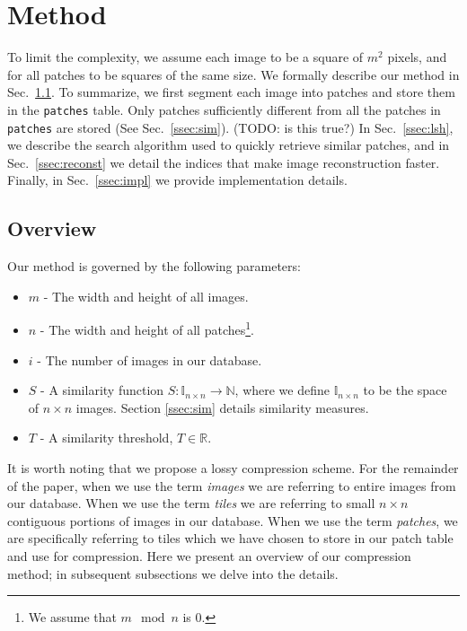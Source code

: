 \section{Method}\label{sec:method}

To limit the complexity, we assume
each image to be a square of $m^2$ pixels, and for all patches to
be squares of the same size.
We formally describe our method in Sec.~\ref{ssec:overview}. To summarize,
we first segment each image into patches and store them in the \texttt{patches} table.
Only patches sufficiently different
from all the patches in \texttt{patches} are stored (See Sec.~\ref{ssec:sim}). (TODO: is this true?)
In 
Sec.~\ref{ssec:lsh}, we describe the
search algorithm used to quickly retrieve similar patches, and in Sec.~\ref{ssec:reconst}
we detail the indices that make image reconstruction faster. Finally, in
Sec.~\ref{ssec:impl} we provide implementation details.

\subsection{Overview}\label{ssec:overview}

Our method is governed by the following parameters:
\begin{itemize}
\item $m$ - The width and height of all images.
\item $n$ - The width and height of all patches\footnote{We assume that $m \mod n$ is $0$.}.
\item $i$ - The number of images in our database.
\item $S$ - A similarity function $S \colon \mathds{I}_{n \times n}  \to \mathds{N}$, where we define $\mathds{I}_{n \times n}$ to be the space of $n \times n$ images.  Section \ref{ssec:sim} details similarity measures.
\item $T$ - A similarity threshold, $T \in \mathds{R}$.

\end{itemize}

It is worth noting that we propose a lossy compression scheme.  For the remainder of the paper, when we use the term \emph{images} we are referring to entire images from our database.  When we use the term \emph{tiles} we are referring to small $n \times n$ contiguous portions of images in our database.  When we use the term \emph{patches}, we are specifically referring to tiles which we have chosen to store in our patch table and use for compression.  Here we present an overview of our compression method; in subsequent subsections we delve into the details.  

